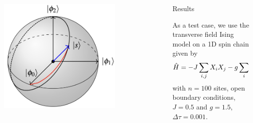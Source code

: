 \documentclass[final,hyperref={pdfpagelabels=false},mathserif]{beamer}
\begin{document}
\begin{columns}[t]
\begin{column}{40cm}
\begin{block}
\begin{columns}
    \begin{column}{0.5\textwidth}
        \centering
        \includegraphics[width=0.75\textwidth]{sphere-bite.png}
    \end{column}
    \begin{column}{0.5\textwidth}
        \label{fig:sphere}
    \end{column}
\end{columns}

\end{block}
	


\end{column}

%
%
%      
%
%


\begin{column}{40cm}
     

%
%
\begin{block}
{Results}

As a test case, we use the transverse field Ising model on a 1D spin chain given by
\begin{equation}
    \hat{H} = -J\sum_{i,j} X_i X_j -g \sum_{i}Z_i,
    \notag
\end{equation}
\vskip -5pt
with $n=100$ sites, open boundary conditions, $J=0.5$ and $g=1.5$, $\Delta \tau = 0.001$.
\vskip -5pt


\end{block}
\end{column}
\end{columns}
\end{document}
